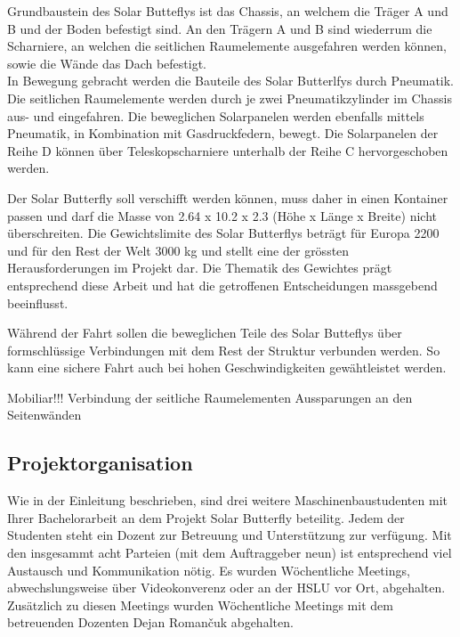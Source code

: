 Grundbaustein des Solar Butteflys ist das Chassis, an welchem die Träger A und B und der Boden befestigt sind. An den Trägern A und B sind wiederrum die Scharniere, an welchen die seitlichen Raumelemente ausgefahren werden können, sowie die Wände das Dach befestigt.\\
In Bewegung gebracht werden die Bauteile des Solar Butterlfys durch Pneumatik. Die seitlichen Raumelemente werden durch je zwei Pneumatikzylinder im Chassis aus- und eingefahren. Die beweglichen Solarpanelen werden ebenfalls mittels Pneumatik, in Kombination mit Gasdruckfedern, bewegt. Die Solarpanelen der Reihe D können über Teleskopscharniere unterhalb der Reihe C hervorgeschoben werden.

Der Solar Butterfly soll verschifft werden können, muss daher in einen Kontainer passen und darf die Masse von 2.64 x 10.2 x 2.3 (Höhe x Länge x Breite) nicht überschreiten. Die Gewichtslimite des Solar Butterflys beträgt für Europa 2200 und für den Rest der Welt 3000 kg und stellt eine der grössten Herausforderungen im Projekt dar. Die Thematik des Gewichtes prägt entsprechend diese Arbeit und hat die getroffenen Entscheidungen massgebend beeinflusst.

Während der Fahrt sollen die beweglichen Teile des Solar Butteflys über formschlüssige Verbindungen mit dem Rest der Struktur verbunden werden. So kann eine sichere Fahrt auch bei hohen Geschwindigkeiten gewähtleistet werden.

Mobiliar!!!
Verbindung der seitliche Raumelementen
Aussparungen an den Seitenwänden


\subsection{Projektorganisation}
Wie in der Einleitung beschrieben, sind drei weitere Maschinenbaustudenten mit Ihrer Bachelorarbeit an dem Projekt Solar Butterfly beteilitg. Jedem der Studenten steht ein Dozent zur Betreuung und Unterstützung zur verfügung. Mit den insgesammt acht Parteien (mit dem Auftraggeber neun) ist entsprechend viel Austausch und Kommunikation nötig. Es wurden Wöchentliche Meetings, abwechslungsweise über Videokonverenz oder an der HSLU vor Ort, abgehalten. Zusätzlich zu diesen Meetings wurden Wöchentliche Meetings mit dem betreuenden Dozenten Dejan Roman\v{c}uk abgehalten.
\newpage
